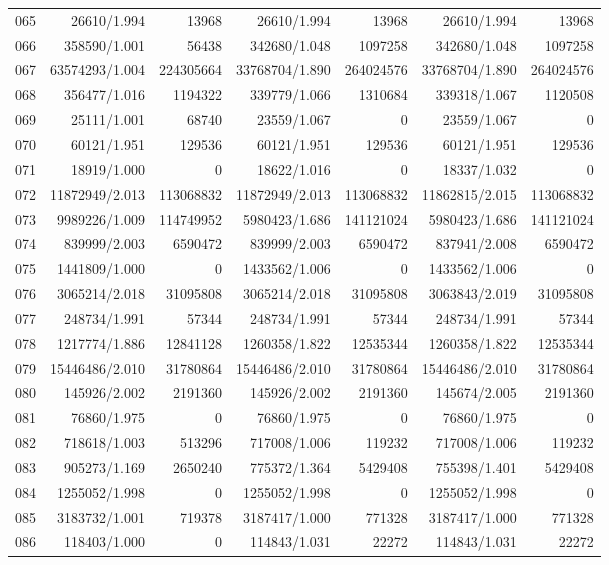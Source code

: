 \begin{longtable}{crrrrrr}
065 & 26610/1.994 & 13968 & 26610/1.994 & 13968 & 26610/1.994 & 13968 \\
066 & 358590/1.001 & 56438 & 342680/1.048 & 1097258 & 342680/1.048 & 1097258 \\
067 & 63574293/1.004 & 224305664 & 33768704/1.890 & 264024576 & 33768704/1.890 & 264024576 \\
068 & 356477/1.016 & 1194322 & 339779/1.066 & 1310684 & 339318/1.067 & 1120508 \\
069 & 25111/1.001 & 68740 & 23559/1.067 & 0 & 23559/1.067 & 0 \\
070 & 60121/1.951 & 129536 & 60121/1.951 & 129536 & 60121/1.951 & 129536 \\
071 & 18919/1.000 & 0 & 18622/1.016 & 0 & 18337/1.032 & 0 \\
072 & 11872949/2.013 & 113068832 & 11872949/2.013 & 113068832 & 11862815/2.015 & 113068832 \\
073 & 9989226/1.009 & 114749952 & 5980423/1.686 & 141121024 & 5980423/1.686 & 141121024 \\
074 & 839999/2.003 & 6590472 & 839999/2.003 & 6590472 & 837941/2.008 & 6590472 \\
075 & 1441809/1.000 & 0 & 1433562/1.006 & 0 & 1433562/1.006 & 0 \\
076 & 3065214/2.018 & 31095808 & 3065214/2.018 & 31095808 & 3063843/2.019 & 31095808 \\
077 & 248734/1.991 & 57344 & 248734/1.991 & 57344 & 248734/1.991 & 57344 \\
078 & 1217774/1.886 & 12841128 & 1260358/1.822 & 12535344 & 1260358/1.822 & 12535344 \\
079 & 15446486/2.010 & 31780864 & 15446486/2.010 & 31780864 & 15446486/2.010 & 31780864 \\
080 & 145926/2.002 & 2191360 & 145926/2.002 & 2191360 & 145674/2.005 & 2191360 \\
081 & 76860/1.975 & 0 & 76860/1.975 & 0 & 76860/1.975 & 0 \\
082 & 718618/1.003 & 513296 & 717008/1.006 & 119232 & 717008/1.006 & 119232 \\
083 & 905273/1.169 & 2650240 & 775372/1.364 & 5429408 & 755398/1.401 & 5429408 \\
084 & 1255052/1.998 & 0 & 1255052/1.998 & 0 & 1255052/1.998 & 0 \\
085 & 3183732/1.001 & 719378 & 3187417/1.000 & 771328 & 3187417/1.000 & 771328 \\
086 & 118403/1.000 & 0 & 114843/1.031 & 22272 & 114843/1.031 & 22272 \\

\end{longtable}
